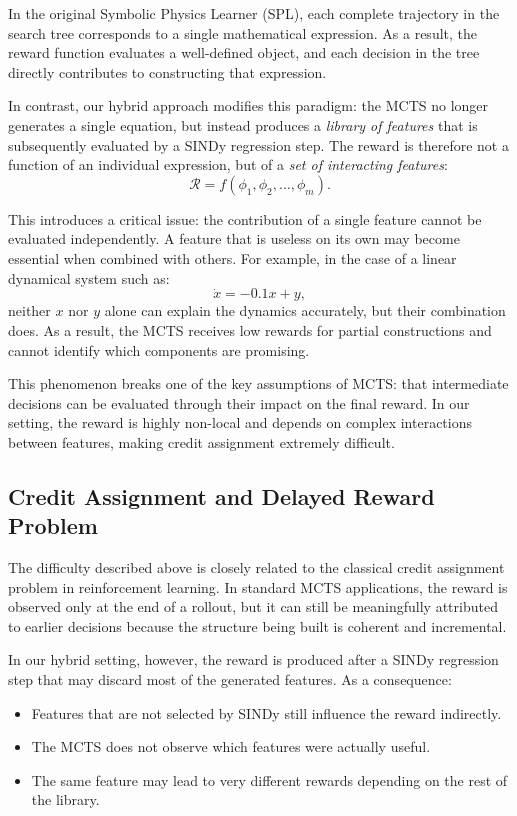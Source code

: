 \documentclass[11pt,a4paper]{article}
\begin{document}
In the original Symbolic Physics Learner (SPL), each complete trajectory in the search tree corresponds to a single mathematical expression. As a result, the reward function evaluates a well-defined object, and each decision in the tree directly contributes to constructing that expression.

In contrast, our hybrid approach modifies this paradigm: the MCTS no longer generates a single equation, but instead produces a \textit{library of features} that is subsequently evaluated by a SINDy regression step. The reward is therefore not a function of an individual expression, but of a \textit{set of interacting features}:
\[
\mathcal{R} = f(\phi_1, \phi_2, \dots, \phi_m).
\]

This introduces a critical issue: the contribution of a single feature cannot be evaluated independently. A feature that is useless on its own may become essential when combined with others. For example, in the case of a linear dynamical system such as:
\[
\dot{x} = -0.1x + y,
\]
neither $x$ nor $y$ alone can explain the dynamics accurately, but their combination does. As a result, the MCTS receives low rewards for partial constructions and cannot identify which components are promising.

This phenomenon breaks one of the key assumptions of MCTS: that intermediate decisions can be evaluated through their impact on the final reward. In our setting, the reward is highly non-local and depends on complex interactions between features, making credit assignment extremely difficult.

\subsection{Credit Assignment and Delayed Reward Problem}

The difficulty described above is closely related to the classical credit assignment problem in reinforcement learning. In standard MCTS applications, the reward is observed only at the end of a rollout, but it can still be meaningfully attributed to earlier decisions because the structure being built is coherent and incremental.

In our hybrid setting, however, the reward is produced after a SINDy regression step that may discard most of the generated features. As a consequence:
\begin{itemize}
    \item Features that are not selected by SINDy still influence the reward indirectly.
    \item The MCTS does not observe which features were actually useful.
    \item The same feature may lead to very different rewards depending on the rest of the library.
\end{itemize}
\end{document}
